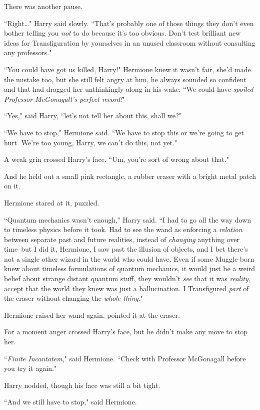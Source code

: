 There was another pause.

``Right{\ldots}" Harry said slowly. ``That's probably one of those things they don't even bother telling you \emph{not} to do because it's too obvious. Don't test brilliant new ideas for Transfiguration by yourselves in an unused classroom without consulting any professors."

``You could have got us killed, Harry!" Hermione knew it wasn't fair, she'd made the mistake too, but she still felt angry at him, he always sounded so confident and that had dragged her unthinkingly along in his wake. ``We could have \emph{spoiled Professor McGonagall's perfect record!}"

``Yes," said Harry, ``let's not tell her about this, shall we?"

``We have to stop," Hermione said. ``We have to stop this or we're going to get hurt. We're too young, Harry, we can't do this, not yet."

A weak grin crossed Harry's face. ``Um, you're sort of wrong about that."

And he held out a small pink rectangle, a rubber eraser with a bright metal patch on it.

Hermione stared at it, puzzled.

``Quantum mechanics wasn't enough," Harry said. ``I had to go all the way down to timeless physics before it took. Had to see the wand as enforcing a \emph{relation} between separate past and future realities, instead of \emph{changing} anything over time\---but I did it, Hermione, I saw past the illusion of objects, and I bet there's not a single other wizard in the world who could have. Even if some Muggle-born knew about timeless formulations of quantum mechanics, it would just be a weird belief about strange distant quantum stuff, they wouldn't \emph{see} that it was \emph{reality}, accept that the world they knew was just a hallucination. I Transfigured \emph{part} of the eraser without changing the \emph{whole thing}."

Hermione raised her wand again, pointed it at the eraser.

For a moment anger crossed Harry's face, but he didn't make any move to stop her.

``\emph{Finite Incantatem}," said Hermione. ``Check with Professor McGonagall before you try it again."

Harry nodded, though his face was still a bit tight.

``And we still have to stop," said Hermione.

